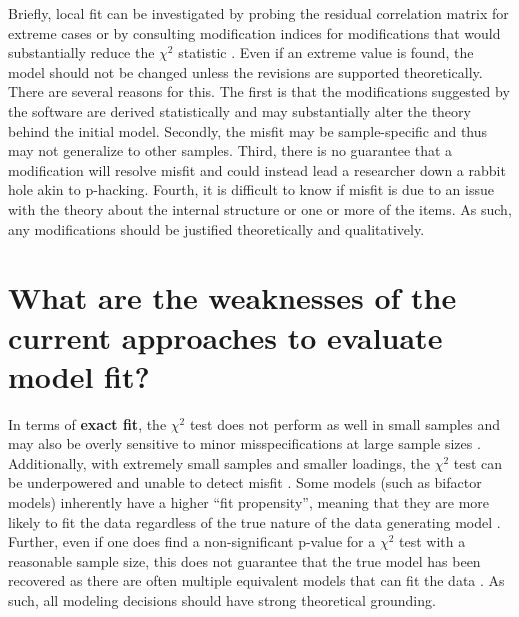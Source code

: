 \documentclass[
]{book}
\begin{document}
Briefly, local fit can be investigated by probing the residual correlation matrix for extreme cases or by consulting modification indices for modifications that would substantially reduce the \({\chi}^2\) statistic \citep{kline_principles_2011}. Even if an extreme value is found, the model should not be changed unless the revisions are supported theoretically. There are several reasons for this. The first is that the modifications suggested by the software are derived statistically and may substantially alter the theory behind the initial model. Secondly, the misfit may be sample-specific and thus may not generalize to other samples. Third, there is no guarantee that a modification will resolve misfit and could instead lead a researcher down a rabbit hole akin to p-hacking. Fourth, it is difficult to know if misfit is due to an issue with the theory about the internal structure or one or more of the items. As such, any modifications should be justified theoretically and qualitatively.

\hypertarget{fit-weaknesses}{%
\chapter{What are the weaknesses of the current approaches to evaluate model fit?}\label{fit-weaknesses}}

In terms of \textbf{exact fit}, the \({\chi}^2\) test does not perform as well in small samples and may also be overly sensitive to minor misspecifications at large sample sizes \citep{browne_alternative_1992, hu_can_1992}. Additionally, with extremely small samples and smaller loadings, the \({\chi}^2\) test can be underpowered and unable to detect misfit \citep{mcneish_thorny_2018}. Some models (such as bifactor models) inherently have a higher ``fit propensity'', meaning that they are more likely to fit the data regardless of the true nature of the data generating model \citep{bonifay_complexity_2017, bonifay_three_2017, preacher_quantifying_2006}. Further, even if one does find a non-significant p-value for a \({\chi}^2\) test with a reasonable sample size, this does not guarantee that the true model has been recovered as there are often multiple equivalent models that can fit the data \citep{hayduk_seeing_2014}. As such, all modeling decisions should have strong theoretical grounding.
\end{document}
